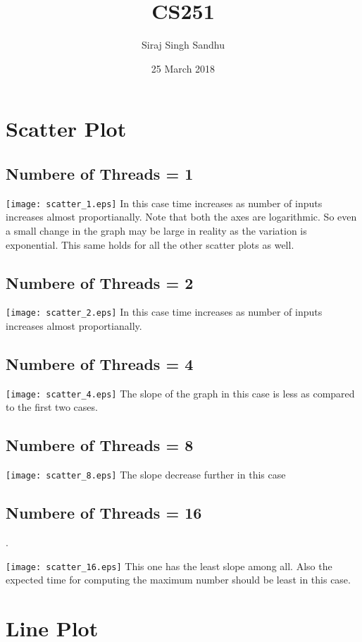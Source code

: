 \documentclass{article}
\title{CS251}
\author{Siraj Singh Sandhu}
\date{25 March 2018}
\begin{document}
\maketitle

\section{Scatter Plot}

\subsection*{Numbere of Threads = 1}
\texttt{[image: scatter\_1.eps]}\newline
In this case time increases as number of inputs increases almost proportianally. Note that both the axes are logarithmic. So even a small change in the graph may be large in reality as the variation is exponential.
This same holds for all the other scatter plots as well.
\newpage
\subsection*{Numbere of Threads = 2}
\texttt{[image: scatter\_2.eps]}\newline
In this case time increases as number of inputs increases almost proportianally.
\newpage
\subsection*{Numbere of Threads = 4}

\texttt{[image: scatter\_4.eps]}\newline
The slope of the graph in this case is less as compared to the first two cases. 
\newpage
\subsection*{Numbere of Threads = 8}
\texttt{[image: scatter\_8.eps]}\newline
The slope decrease further in this case
\newpage 
\subsection*{Numbere of Threads = 16}.

\texttt{[image: scatter\_16.eps]}\newline
This one has the least slope among all. Also the expected time for computing the maximum number should be least in this case.
\newpage 
\section{Line Plot}
\end{document}
